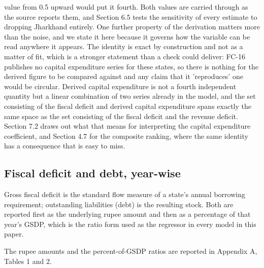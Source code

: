 \documentclass[12pt,a4paper]{article}
\begin{document}
value from 0.5 upward would put it fourth. Both values are carried through as the source reports them, and Section 6.5 tests the sensitivity of every estimate to dropping Jharkhand entirely. One further property of the derivation matters more than the noise, and we state it here because it governs how the variable can be read anywhere it appears. The identity is exact by construction and not as a matter of fit, which is a stronger statement than a check could deliver: FC-16 publishes no capital expenditure series for these states, so there is nothing for the derived figure to be compared against and any claim that it 'reproduces' one would be circular. Derived capital expenditure is not a fourth independent quantity but a linear combination of two series already in the model, and the set consisting of the fiscal deficit and derived capital expenditure spans exactly the same space as the set consisting of the fiscal deficit and the revenue deficit. Section 7.2 draws out what that means for interpreting the capital expenditure coefficient, and Section 4.7 for the composite ranking, where the same identity has a consequence that is easy to miss.

\subsection{Fiscal deficit and debt, year-wise}

Gross fiscal deficit is the standard flow measure of a state's annual borrowing requirement; outstanding liabilities (debt) is the resulting stock. Both are reported first as the underlying rupee amount and then as a percentage of that year's GSDP, which is the ratio form used as the regressor in every model in this paper.

The rupee amounts and the percent-of-GSDP ratios are reported in Appendix A, Tables 1 and 2.
\end{document}
